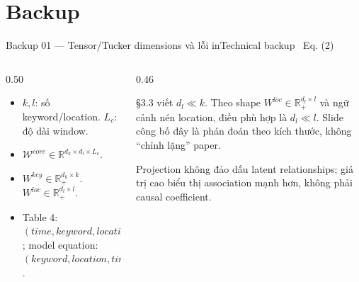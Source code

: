 \appendix
\section{Backup}

\begin{frame}[shrink=27]{Backup 01 --- Tensor/Tucker dimensions và lỗi in}{Technical backup \textperiodcentered\ Eq. (2)}
\vspace{3mm}
\begin{columns}[T,onlytextwidth]
\begin{column}{0.50\textwidth}
\begin{mathcard}
  \begin{itemize}
    \item $k,l$: số keyword/location.
    $L_c$: độ dài window.
    \item $\mathcal W^{core}\in\mathbb R^{d_k\times d_l\times L_c}$.
    \item $W^{key}\in\mathbb R_+^{d_k\times k}$.
    $W^{loc}\in\mathbb R_+^{d_l\times l}$.
    \item Table 4: $(time,keyword,location)$; model equation: $(keyword,location,time)$.
  \end{itemize}
\end{mathcard}
\end{column}
\begin{column}{0.46\textwidth}
\begin{caution}
  §3.3 viết $d_l\ll k$. Theo shape $W^{loc}\in\mathbb R_+^{d_l\times l}$ và ngữ cảnh nén location, điều phù hợp là $d_l\ll l$. Slide công bố đây là phán đoán theo kích thước, không “chỉnh lặng” paper.
\end{caution}
\vspace{3mm}
\begin{intuition}
  Projection không đảo dấu latent relationships; giá trị cao biểu thị association mạnh hơn, không phải causal coefficient.
\end{intuition}
\end{column}
\end{columns}
\vspace{2mm}
\end{frame}

